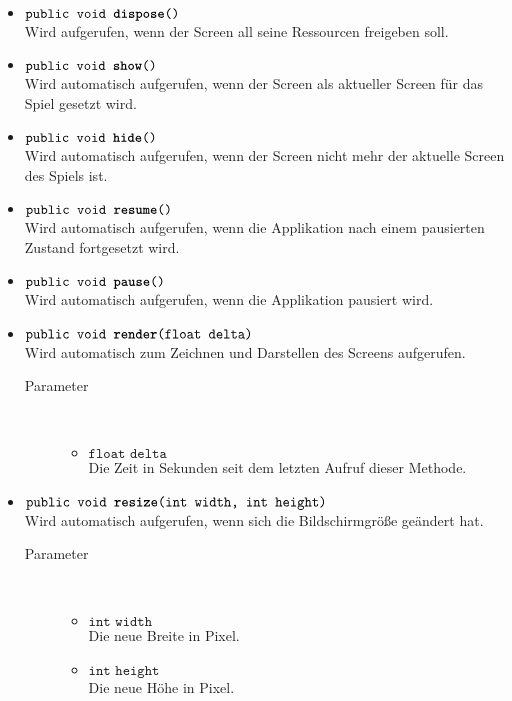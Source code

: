 \begin{description}
\begin{itemize}
		\item $\texttt{public void \textbf{dispose}()}$ \\ Wird aufgerufen, wenn der Screen all seine Ressourcen freigeben soll.
		
		\item $\texttt{public void \textbf{show}()}$ \\ Wird automatisch aufgerufen, wenn der Screen als aktueller Screen für das Spiel gesetzt wird.
	
		\item $\texttt{public void \textbf{hide}()}$ \\ Wird automatisch aufgerufen, wenn der Screen nicht mehr der aktuelle Screen des Spiels ist.
	
		\item $\texttt{public void \textbf{resume}()}$ \\ Wird automatisch aufgerufen, wenn die Applikation nach einem pausierten Zustand fortgesetzt wird.	
	
		\item $\texttt{public void \textbf{pause}()}$ \\ Wird automatisch aufgerufen, wenn die Applikation pausiert wird.
	
		\item $\texttt{public void \textbf{render}(float delta)}$ \\ Wird automatisch zum Zeichnen und Darstellen des Screens aufgerufen.
		\begin{description}
			\item[Parameter] \hfill \\
			\vspace{-.8cm}
			\begin{itemize}
				\item $\texttt{float delta}$ \\ Die Zeit in Sekunden seit dem letzten Aufruf dieser Methode.
			\end{itemize}
		\end{description}	
	
		\item $\texttt{public void \textbf{resize}(int width, int height)}$ \\ Wird automatisch aufgerufen, wenn sich die Bildschirmgröße geändert hat.
		\begin{description}
			\item[Parameter] \hfill \\
			\vspace{-.8cm}
			\begin{itemize}
				\item $\texttt{int width}$ \\ Die neue Breite in Pixel.
				\item $\texttt{int height}$ \\ Die neue Höhe in Pixel.
			\end{itemize}
		\end{description}
	\end{itemize}
\end{description}